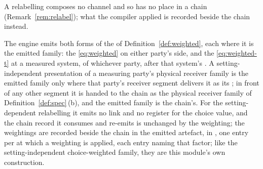 
A relabelling composes no channel and so has no place in a chain
(Remark~\ref{rem:relabel}); what the compiler applied is recorded beside the
chain instead.

\begin{requirement}\label{req:choice-weighting-record}
The engine emits both forms of the  of
Definition~\ref{def:weighted}, each where it is the emitted family: the
 \eqref{eq:weighted} on either party's side,
and the  \eqref{eq:weighted-t} at a measured
system, of whichever party, after that system's . A
setting-independent presentation of a measuring party's physical receiver
family is the emitted family only where that party's receiver segment
delivers it as its ; in front of any other
segment it is handed to the chain as the physical receiver family of
Definition~\ref{def:spec}\,(b), and the emitted family is the chain's. For the
setting-dependent relabelling it emits no link and no register
for the choice value, and the chain record it consumes and re-emits is
unchanged by the weighting; the weightings are recorded beside the chain in
the emitted artefact, in , one entry per
 at which a weighting is applied, each entry naming
that factor; like the setting-independent choice-weighted
family, they are this module's own construction.
\end{requirement}
